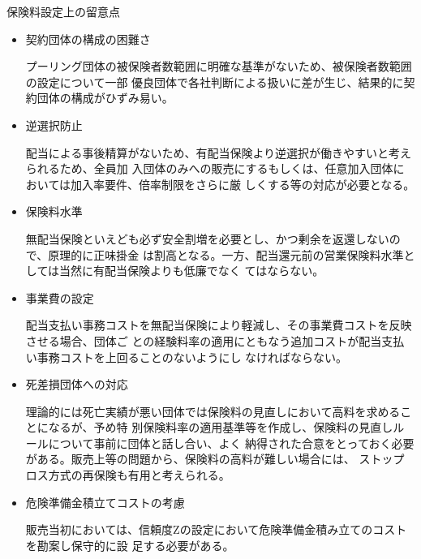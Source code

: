\documentclass[report,gutter=10mm,fore-edge=10mm,uplatex,dvipdfmx]{jlreq}
\begin{document}
\begin{itemize}
\begin{itemize}
\end{itemize}
 保険料設定上の留意点
\begin{itemize}
\item[]契約団体の構成の困難さ\par
 プーリング団体の被保険者数範囲に明確な基準がないため、被保険者数範囲の設定について一部
 優良団体で各社判断による扱いに差が生じ、結果的に契約団体の構成がひずみ易い。
\item[]逆選択防止\par
 配当による事後精算がないため、有配当保険より逆選択が働きやすいと考えられるため、全員加
 入団体のみへの販売にするもしくは、任意加入団体においては加入率要件、倍率制限をさらに厳
 しくする等の対応が必要となる。
\item[]保険料水準\par
 無配当保険といえども必ず安全割増を必要とし、かつ剰余を返還しないので、原理的に正味掛金
 は割高となる。一方、配当還元前の営業保険料水準としては当然に有配当保険よりも低廉でなく
 てはならない。
\item[]事業費の設定\par
 配当支払い事務コストを無配当保険により軽減し、その事業費コストを反映させる場合、団体ご
 との経験料率の適用にともなう追加コストが配当支払い事務コストを上回ることのないようにし
 なければならない。
\item[]死差損団体への対応\par
 理論的には死亡実績が悪い団体では保険料の見直しにおいて高料を求めることになるが、予め特
 別保険料率の適用基準等を作成し、保険料の見直しルールについて事前に団体と話し合い、よく
 納得された合意をとっておく必要がある。販売上等の問題から、保険料の高料が難しい場合には、
 ストップロス方式の再保険も有用と考えられる。
\item[]危険準備金積立てコストの考慮\par
 販売当初においては、信頼度Zの設定において危険準備金積み立てのコストを勘案し保守的に設
 足する必要がある。
\end{itemize}
\end{itemize}
\end{document}
